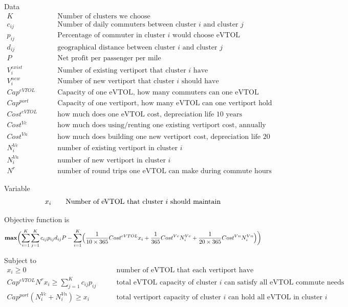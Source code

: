 \documentclass{article}
\begin{document}
Data
\[
\begin{split}
K& \qquad \text{Number of clusters we choose}\\
c_{ij}&  \qquad \text{Number of daily commuters between cluster $i$ and cluster $j$} \\
p_{ij}& \qquad \text{Percentage of commuter in cluster $i$ would choose eVTOL}\\
d_{ij}&  \qquad \text{geographical distance between cluster $i$ and cluster $j$} \\
P & \qquad \text{Net profit per passenger per mile} \\
V^{exist}_i & \qquad \text{Number of existing vertiport that cluster $i$ have} \\
V^{new}_i & \qquad \text{Number of new vertiport that cluster $i$ should have} \\
Cap^{eVTOL} & \qquad \text{Capacity of one eVTOL, how many commuters can one eVTOL hold} \\
Cap^{port} & \qquad \text{Capacity of one vertiport, how many eVTOL can one vertiport hold} \\
Cost^{eVTOL} & \qquad \text{how much does one eVTOL cost, depreciation life 10 years} \\
Cost^{Ve} & \qquad \text{how much does using/renting one existing vertiport cost, annually} \\
Cost^{Vn} & \qquad \text{how much does building one new vertiport cost, depreciation life 20 years} \\
N^{Ve}_i & \qquad \text{number of existing vertiport in cluster $i$} \\
N^{Vn}_i & \qquad \text{number of new vertiport in cluster $i$} \\
N^{r} & \qquad \text{number of round trips one eVTOL can make during commute hours}
\end{split}
\]

Variable
\[
x_{i}  \qquad \text{Number of eVTOL that cluster $i$ should maintain} \\
\]


Objective function is 
\[
\textbf{max} \biggl( \sum_{i=1}^K \sum_{j=1}^K c_{ij}p_{ij} d_{ij}P - \sum_{i=1}^K\Bigl( \frac{1}{10\times365}Cost^{eVTOL}x_i + \frac{1}{365}Cost^{Ve}N^{Ve}_i + \frac{1}{20\times365}Cost^{Vn}N^{Vn}_i  \Bigl)\biggl)
\]

Subject to
\[
\begin{split}
x_i  \geq 0 &\qquad \text{number of eVTOL that each vertiport have cannot be zero}\\
Cap^{eVTOL}N^{r}x_i \geq \sum_{j=1}^K c_{ij}p_{ij} &\qquad \text{total eVTOL capacity of cluster $i$ can satisfy all eVTOL commute needs} \\
Cap^{port}(N^{Ve}_i+N^{Vn}_i) \geq x_i &\qquad  \text{total vertiport capacity of cluster $i$ can hold all eVTOL in cluster $i$} \\
\end{split}
\]
\end{document}
